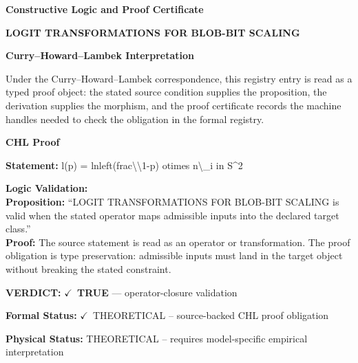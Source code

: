 \clearpage
\begingroup\tzpsupportsetup
\noindent\textbf{\fontsize{10.8pt}{12.8pt}\selectfont [ID 0505] Constructive Logic and Proof Certificate}\par
\noindent\textbf{\fontsize{10pt}{12pt}\selectfont LOGIT TRANSFORMATIONS FOR BLOB-BIT SCALING}\par
\vspace{0.45em}
\begingroup
\footnotesize
\setlength{\parskip}{0.22em}
\setlength{\parindent}{0pt}
\noindent\textbf{Curry--Howard--Lambek Interpretation}\par
Under the Curry--Howard--Lambek correspondence, this registry entry is read as a typed proof
object: the stated source condition supplies the proposition, the derivation supplies the
morphism, and the proof certificate records the machine handles needed to check the obligation
in the formal registry.

\vspace{0.45em}
\noindent\textbf{CHL Proof}\par
\textbf{Statement:} l(p) = lnleft(frac\textbackslash{}\textbackslash{}1-p) otimes n\textbackslash{}\_i in S\textasciicircum{}2

\textbf{Logic Validation:}\\
\textbf{Proposition:} ``LOGIT TRANSFORMATIONS FOR BLOB-BIT SCALING is valid when the stated operator maps
admissible inputs into the declared target class.''\\
\textbf{Proof:} The source statement is read as an operator or transformation. The proof obligation is
type preservation: admissible inputs must land in the target object without breaking the
stated constraint.

\textbf{VERDICT:} \ensuremath{\checkmark}\ \textbf{TRUE} --- operator-closure validation

\textbf{Formal Status:} \ensuremath{\checkmark}\ THEORETICAL -- source-backed CHL proof obligation

\textbf{Physical Status:} THEORETICAL -- requires model-specific empirical interpretation
\par\vspace{0.45em}
\par
\ifTZPDarkEdition
{}
\fi
\endgroup
\endgroup
